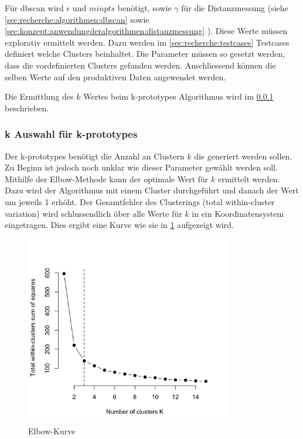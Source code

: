 Für \gls{dbscan} wird $\epsilon$ und $minpts$ benötigt, sowie $\gamma$ für die Distanzmessung (siehe \cref{sec:recherche:algorithmen:dbscan}  sowie \cref{sec:konzept:anwendungderalgorithmen:distanzmessung} ). Diese Werte müssen explorativ ermittelt werden. Dazu werden im \cref{sec:recherche:testcases} Testcases definiert welche Clusters beinhaltet. Die Parameter müssen so gesetzt werden, dass die vordefinierten Clusters gefunden werden. Anschliessend können die selben Werte auf den produktiven Daten angewendet werden.

Die Ermittlung des $k$ Wertes beim k-prototypes Algorithmus wird im \cref{sec:konzept:parameterauswahl:kprototypes} beschrieben.

\subsubsection{k Auswahl für k-prototypes}
\label{sec:konzept:parameterauswahl:kprototypes}
Der k-prototypes benötigt die Anzahl an Clustern $k$ die generiert werden sollen. Zu Beginn ist jedoch noch unklar wie dieser Parameter gewählt werden soll. Mithilfe der Elbow-Methode kann der optimale Wert für $k$ ermittelt werden. Dazu wird der Algorithmus mit einem Cluster durchgeführt und danach der Wert um jeweils 1 erhöht. Der Gesamtfehler des Clusterings (total within-cluster variation) wird schlussendlich über alle Werte für $k$ in ein Koordinatensystem eingetragen. Dies ergibt eine Kurve wie sie in \cref{fig:konzept:parameterauswahl:kprototypes} aufgezeigt wird.

\begin{figure}[H]
	\RawFloats
	\centering
	\includegraphics[width=0.8\textwidth]{images/elbow-curve.png}
	\caption{Elbow-Kurve}
	\label{fig:konzept:parameterauswahl:kprototypes}
\end{figure}

